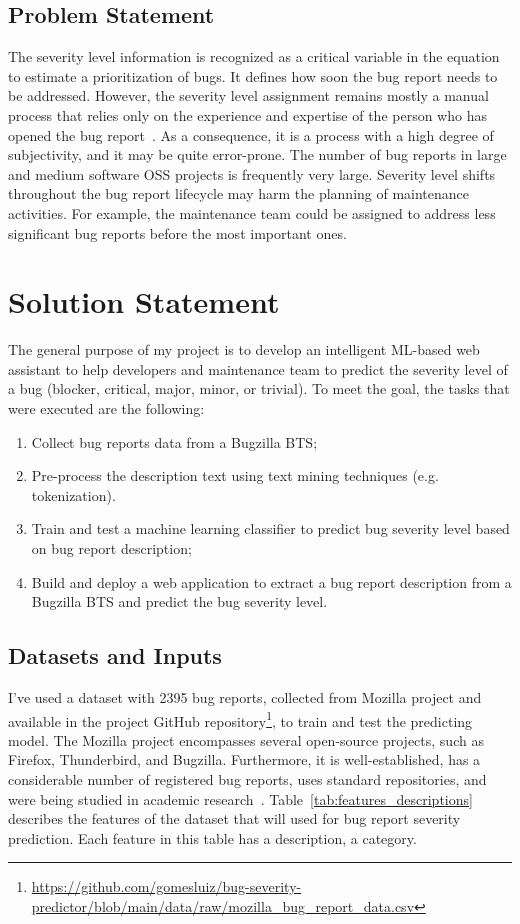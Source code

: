 \documentclass[a4paper]{article}
\begin{document}
\subsection{Problem Statement}
The severity level information is recognized as a critical variable in the equation to estimate a prioritization of bugs. It defines how soon the bug report needs to be addressed. However, the severity level assignment remains mostly a manual process that relies only on the experience and expertise of the person who has opened the bug report~\cite{Yang:2017}. As a consequence, it is a process with a high degree of subjectivity, and it may be quite error-prone. The number of bug reports in large and medium software OSS projects is frequently very large. Severity level shifts throughout the bug report lifecycle may harm the planning of maintenance activities. For example, the maintenance team could be assigned to address less significant bug reports before the most important ones.

\bigskip

\section{Solution Statement}
The general purpose of my project is to develop an intelligent ML-based web assistant to help developers and maintenance team to predict the severity level of a bug (blocker, critical, major, minor, or trivial). To meet the goal, the tasks that were executed are the following:
\begin{enumerate}
    \item Collect bug reports data from a Bugzilla BTS;
    \item Pre-process the description text using text mining techniques (e.g. tokenization).
    \item Train and test a machine learning classifier to predict bug severity level based on bug report description;
    \item Build and deploy a web application to extract a bug report description from a Bugzilla BTS and predict the bug severity level.
\end{enumerate}
\subsection{Datasets and Inputs}
I've used a dataset with 2395 bug reports, collected from Mozilla project and available in the project GitHub repository\footnote{\url{https://github.com/gomesluiz/bug-severity-predictor/blob/main/data/raw/mozilla_bug_report_data.csv}}, to train and test the predicting model. The Mozilla project encompasses several open-source projects, such as Firefox, Thunderbird, and Bugzilla. Furthermore, it is well-established, has a considerable number of registered bug reports, uses standard repositories, and were being studied in academic research~\cite{Lamkanfi:2010, Lamkanfi:2011, Tian:2012}. Table~\ref{tab:features_descriptions} describes the features of the dataset that will used for bug report severity prediction. Each feature in this table has a description, a category.
\end{document}
